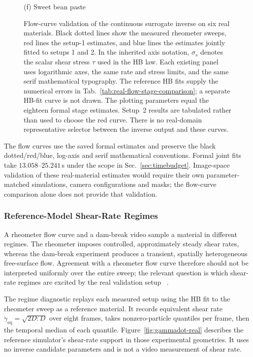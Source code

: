 \begin{figure}[!htbp]
\begin{minipage}[t]{0.32\textwidth}
        {\footnotesize (f) Sweet bean paste}
    \end{minipage}
    \caption{Flow-curve validation of the continuous surrogate inverse
    on six real materials. Black dotted lines show the measured
    rheometer sweeps, red lines the setup-1 estimates, and blue lines
    the estimates jointly fitted to setups 1 and 2. In the inherited
    axis notation, $\sigma_s$ denotes the scalar shear stress $\tau$
    used in the HB law. Each existing panel uses logarithmic axes,
    the same rate and stress limits, and the same serif mathematical
    typography. The reference HB fits supply the numerical errors in
    Tab.~\ref{tab:real-flow-stage-comparison}; a separate HB-fit curve
    is not drawn. The plotting parameters equal the eighteen formal
    stage estimates. Setup~2 results are tabulated rather than used
    to choose the red curve. There is no real-domain representative
    selector between the inverse output and these curves.}
    \label{fig:flow-real}
\end{figure}

The flow curves use the saved formal estimates and preserve the
black dotted/red/blue, log-axis and serif mathematical conventions.
Formal joint fits take $13.058$--$25.241$\,s under the scope in
Sec.~\ref{sec:timebudget}. Image-space validation of these real-material
estimates would require their own parameter-matched simulations,
camera configurations and masks; the flow-curve comparison alone does
not provide that validation.

\subsubsection{Reference-Model Shear-Rate Regimes}
A rheometer flow curve and a dam-break video sample a material in
different regimes. The rheometer imposes controlled, approximately steady
shear rates, whereas the dam-break experiment produces a transient,
spatially heterogeneous free-surface flow. Agreement with a rheometer
flow curve therefore should not be interpreted uniformly over the entire
sweep; the relevant question is which shear-rate regimes are excited by
the real validation setup
~\citep{balmforth2007two,pashias1996fifty,ahmadi2022identification,muchiri2024identification}.

The regime diagnostic replays each measured setup using the HB fit
to the rheometer sweep as a reference material. It records equivalent
shear rate $\dot\gamma_{\mathrm{eq}}=\sqrt{2D:D}$ over eight frames,
takes nonzero-particle quantiles per frame, then the temporal median
of each quantile. Figure~\ref{fig:gammadot-real} describes the
reference simulator's shear-rate support in those experimental
geometries. It uses no inverse candidate parameters and is not a
video measurement of shear rate.

